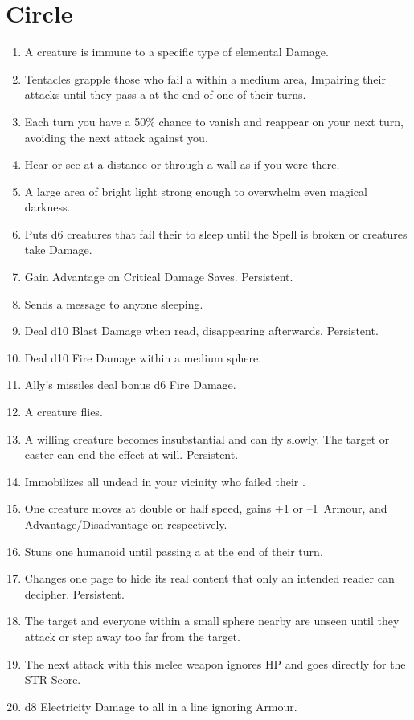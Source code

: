 \documentclass[itdr]{subfiles}
\begin{document}
\vfill
\break

\section{ Circle}
\def \spellcircle {3}
\begin{enumerate}
	\item {} A creature is immune to a specific type of elemental Damage.
	\item {} Tentacles grapple those who fail a  within a medium area, Impairing their attacks until they pass a  at the end of one of their turns.
	\item {} Each turn you have a 50\% chance to vanish and reappear on your next turn, avoiding the next attack against you.
	\item {} Hear or see at a distance or through a wall as if you were there.
	\item {} A large area of bright light strong enough to overwhelm even magical darkness.
	\item {} Puts d6 creatures that fail their  to sleep until the Spell is broken or creatures take Damage.
	\item {} Gain Advantage on Critical Damage Saves. Persistent.
	\item {} Sends a message to anyone sleeping.
	\item {} Deal d10 Blast Damage when read, disappearing afterwards. Persistent.
	\item {} Deal d10 Fire Damage within a medium sphere.
	\item {} Ally's missiles deal bonus d6 Fire Damage.
	\item {} A creature flies.
	\item {} A willing creature becomes \mbox{insubstantial} and can fly slowly. The target or caster can end the effect at will. Persistent.
	\item {} Immobilizes all undead in your vicinity who failed their .
	\item {} One creature moves at double or half speed, gains +1 or --1~Armour, and Advantage/Disadvantage on  respectively.
	\item {} Stuns one humanoid until passing a  at the end of their turn.
	\item {} Changes one page to hide its real content that only an intended reader can decipher. Persistent.
	\item {} The target and everyone within a small sphere nearby are unseen until they attack or step away too far from the target.
	\item {} The next attack with this melee weapon ignores HP and goes directly for the STR Score.
	\item {} d8 Electricity Damage to all in a line ignoring Armour.


\end{enumerate}
\end{document}
